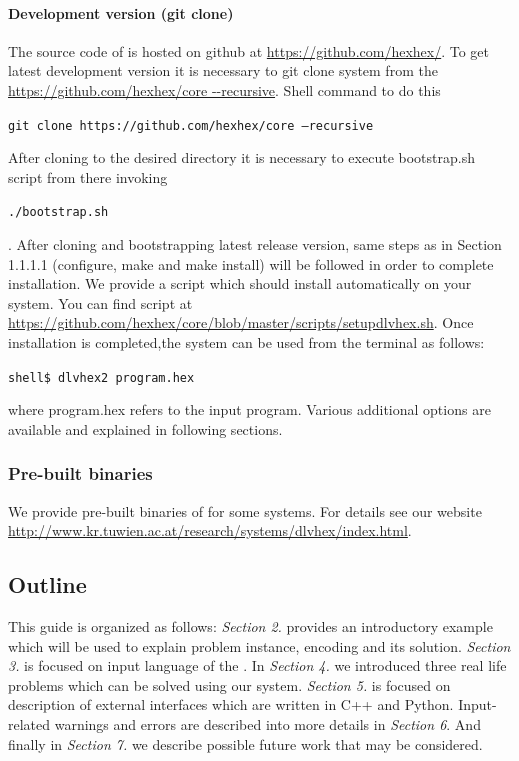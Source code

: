 \documentclass[14pt,a4paper, titlepage]{article}
\begin{document}
\paragraph{Development version (git clone)}
The source code of \dlvhex{} is hosted on github at \url{https://github.com/hexhex/}. To get latest development version it is necessary to git clone system from the \url{https://github.com/hexhex/core --recursive}. Shell command to do this
\\ \centerline{\texttt{git clone https://github.com/hexhex/core --recursive}} 
After cloning to the desired directory it is necessary to execute bootstrap.sh script from there invoking \\ \centerline{\texttt{./bootstrap.sh}}. 
After cloning and bootstrapping latest release version, same steps as in Section 1.1.1.1 (configure, make and make install) will be followed in order to complete installation.
We provide a script which should install \dlvhex{} automatically on your system. You can find script at \url{https://github.com/hexhex/core/blob/master/scripts/setupdlvhex.sh}.
Once installation is completed,the system can be used from the terminal as follows:\\ 
\centerline{\texttt{shell\$ dlvhex2 program.hex}} where program.hex refers to the input program. Various additional options are available and explained in following sections.    

\subsubsection{Pre-built binaries}
We provide pre-built binaries of \dlvhex{} for some systems. For details see our website \url{http://www.kr.tuwien.ac.at/research/systems/dlvhex/index.html}. 

\subsection{Outline}
This guide is organized as follows: \emph{Section 2.} provides an introductory example which will be used to explain problem instance, encoding and its solution. \emph{Section 3.} is focused on input language of the \dlvhex{}. In \emph{Section 4.} we introduced three real life problems which can be solved using our system. \emph{Section 5.} is focused on description of external interfaces which are written in C++ and Python. Input-related warnings and errors are described into more details in \emph{Section 6}. And finally in \emph{Section 7.} we describe possible future work that may be considered.
\end{document}
